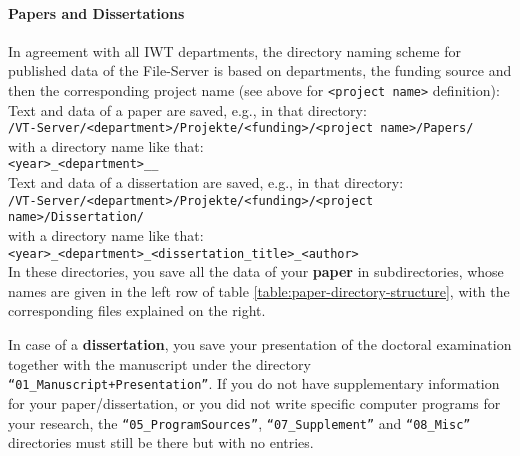 \paragraph{Papers and Dissertations}

\noindent In agreement with all IWT departments, the directory naming scheme for
published data of the File-Server is based on departments, the funding source
and then the corresponding project name (see above for \texttt{<project name>}
definition):
\\
Text and data of a paper are saved, e.g., in that directory:  \\
\texttt{/VT-Server/<department>/Projekte/<funding>/<project name>/Papers/} \\
with a directory name like that:
\\
\texttt{<year>\_<department>\_<paper-name>\_<first author>} \\
Text and data of a dissertation are saved, e.g., in that directory:
\\
\texttt{/VT-Server/<department>/Projekte/<funding>/<project name>/Dissertation/} \\
with a directory name like that:
\\
\texttt{<year>\_<department>\_<dissertation\_title>\_<author>} \\
In these directories, you save all the data of your \textbf{paper} in
subdirectories, whose names are given in the left row of table
\ref{table:paper-directory-structure}, with the corresponding
files explained on the right.
\begin{table}[!h]
  \caption{%
  The data of every paper has to be saved in eight subdirectories;
  further remarks: \\
  **When the paper is ready for press the corresponding author loads the last and
  revised version (i.e. only the real used but absolutely complete data) into
  the protected directory \\
  ***If the data reproduced in a figure/table is from distributed primary data
  directories, it is sufficient to save here only the generating program%
  }

\label{table:paper-directory-structure}
\end{table}

In case of a \textbf{dissertation}, you save your presentation of the doctoral
examination together with the manuscript under the directory
\texttt{“01\_Manuscript+Presentation”}. If you do not have supplementary
information for your paper/dissertation, or you did not write specific computer
programs for your research, the \texttt{“05\_ProgramSources”},
\texttt{“07\_Supplement”} and \texttt{“08\_Misc”} directories must still be
there but with no entries.

